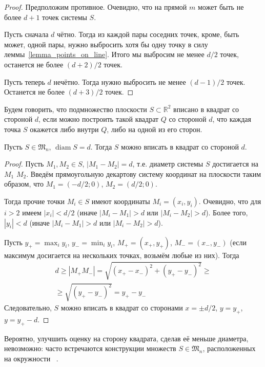 \begin{proof}
	Предположим противное.
	Очевидно, что на прямой $m$ может быть не более $d+1$ точек системы $S$.

	Пусть сначала $d$ чётно.
	Тогда из каждой пары соседних точек, кроме, быть может, одной пары,
	нужно выбросить хотя бы одну точку в силу леммы~\ref{lemma_points_on_line}.
	Итого мы выбросим не менее $d/2$ точек,
	останется не более $(d+2)/2$ точек.

	Пусть теперь $d$ нечётно.
	Тогда нужно выбросить не менее $(d-1)/2$ точек.
	Останется не более $(d+3)/2$ точек.
\end{proof}

\begin{definition}
	Будем говорить, что подмножество плоскости $S\subset\mathbb{R}^2$
	вписано в квадрат со стороной $d$, если
	можно построить такой квадрат $Q$ со стороной $d$,
	что каждая точка $S$ окажется либо внутри $Q$, либо на одной из его сторон.
\end{definition}

\begin{lemma}
	\label{lemma:square_container}
	Пусть $S\in\mathfrak{M}_n$, $\operatorname{diam} S = d$.
	Тогда $S$ можно вписать в квадрат со стороной $d$.
\end{lemma}

\begin{proof}
	Пусть $M_1, M_2 \in S$, $|M_1 - M_2| = d$,
	т.е. диаметр системы $S$ достигается на $M_1$  $M_2$.
	Введём прямоугольную декартову систему координат на плоскости таким образом, что
	$M_1 = (-d/2; 0)$, $M_2 = (d/2; 0)$.

	Тогда прочие точки $M_i \in S$ имеют координаты $M_i=(x_i, y_i)$.
	Очевидно, что для $i>2$ имеем $|x_i| < d/2$
	(иначе $|M_i - M_1| > d$ или $|M_i - M_2| > d$).
	Более того, $|y_i| < d$ (иначе $|M_i - M_1| > d$ или $|M_i - M_2| > d$).

	Пусть $y_+ = \max_{i} y_i$, $y_- = \min_{i} y_i$, $M_+=(x_+, y_+)$, $M_-=(x_-, y_-)$
	(если максимум досигается на нескольких точках, возьмём любые из них).
	Тогда
	\begin{multline}
		d \geq |M_+ M_-| = \sqrt{(x_+ - x_-)^2 + (y_+ - y_-)^2}
		\geq
		\\\geq
		\sqrt{(y_+ - y_-)^2} =
		y_+ - y_-
	\end{multline}
	Следовательно, $S$ можно вписать в квадрат со сторонами $x=\pm d/2$,
	$y=y_+$, $y=y_+ - d$.
\end{proof}

\begin{remark}
	Вероятно, улучшить оценку на сторону квадрата, сделав её меньше диаметра,
	невозможно: часто встречаются конструкции множеств $S\in\mathfrak{M}_n$, расположенных на окружности
	~\cite{anning1915discussions,harborth1993upper,piepmeyer1996maximum,kurz2008bounds,our-vvmsh-2018}.
\end{remark}

